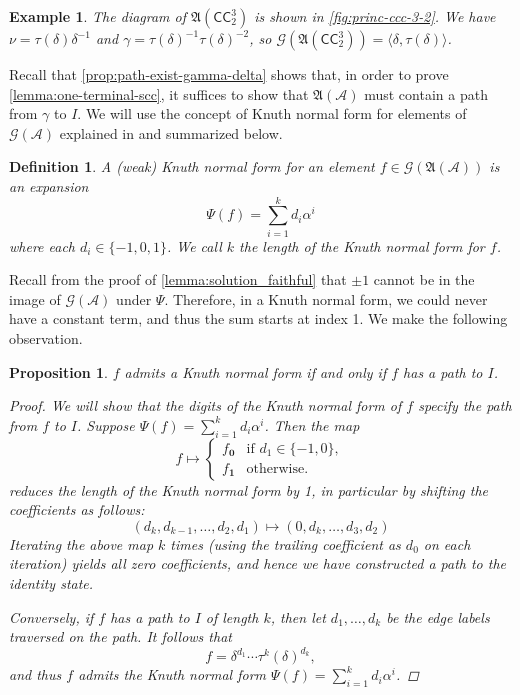 \documentclass[12pt, letterpaper]{article}
\newcommand{\A}{\mathcal A}
\newcommand{\CC}{\mathsf{CC}}
\newcommand{\ch}[1]{\mathbf{#1}}
\newcommand{\res}[2]{{{#1}_{\ch{#2}}}}
\newcommand{\princ}{\mathfrak A}
\newcommand{\gp}{\mathcal G}
\newtheorem{defn}[thm]{Definition}
\newtheorem{prop}[thm]{Proposition}
\newtheorem{example}[thm]{Example}
\begin{document}
\begin{example}
    The diagram of $\princ(\CC^3_2)$ is shown in \cref{fig:princ-ccc-3-2}.  We
    have $\nu = \tau(\delta)\delta^{-1}$ and $\gamma = \tau(\delta)^{-1}
    \tau(\delta)^{-2}$, so $\gp(\princ(\CC^3_2)) = \langle \delta, \tau(\delta)
    \rangle$.
\end{example}

Recall that \cref{prop:path-exist-gamma-delta} shows that, in order to prove
\cref{lemma:one-terminal-scc}, it suffices to show that $\princ(\A)$ must
contain a path from $\gamma$ to $I$. We will use the concept of Knuth normal
form for elements of $\gp(\A)$ explained in \cite{Sutner18:abelian_automata}
and summarized below.
\begin{defn}
    A (weak) Knuth normal form for an element $f \in \gp(\princ(\A))$ is an
    expansion
    \[
        \Psi(f) = \sum_{i=1}^k d_i \alpha^i
    \]
    where each $d_i \in \{-1, 0, 1\}$. We call $k$ the length of the Knuth
    normal form for $f$.
\end{defn}

Recall from the proof of \cref{lemma:solution_faithful} that $\pm 1$ cannot be
in the image of $\gp(\A)$ under $\Psi$. Therefore, in a Knuth normal form, we
could never have a constant term, and thus the sum starts at index 1.  We make
the following observation.
\begin{prop}\label{prop:knf_tame}
    $f$ admits a Knuth normal form if and only if $f$ has a path to $I$.
    \begin{proof}
        We will show that the digits of the Knuth normal form of $f$ specify
        the path from $f$ to $I$.
        Suppose $\Psi(f) = \sum_{i=1}^k d_i \alpha^i$. Then the map
        \[
            f \mapsto \begin{cases}
                \res{f}{0} & \text{if $d_1 \in \{-1, 0\}$},\\
                \res{f}{1} & \text{otherwise}.
            \end{cases}
        \]
        reduces the length of the Knuth normal form by 1, in particular by
        shifting the coefficients as follows:
        \[
            (d_k, d_{k-1}, \ldots, d_2, d_1) \mapsto
            (0, d_k, \ldots, d_3, d_2)
        \]
        Iterating the above map $k$ times (using the trailing coefficient as
        $d_0$ on each iteration) yields all zero coefficients, and hence we
        have constructed a path to the identity state.

        Conversely, if $f$ has a path to $I$ of length $k$, then let
        $d_1, \ldots, d_{k}$ be the edge labels traversed on the path. It
        follows that
        \[
            f = \delta^{d_1} \cdots \tau^k(\delta)^{d_k},
        \]
        and thus $f$ admits the Knuth normal form
        $\Psi(f) = \sum_{i=1}^k d_i \alpha^i$.
    \end{proof}
\end{prop}
\end{document}
